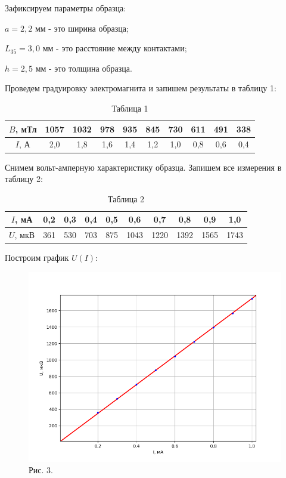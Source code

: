 \documentclass[a4paper,12pt]{article} %
\begin{document}
Зафиксируем параметры образца:

$a = 2,2$ мм - это ширина образца;

$L_{35} = 3,0$ мм - это расстояние между контактами;

$h = 2,5$ мм - это толщина образца.

\vspace{5mm}
Проведем градуировку электромагнита и запишем результаты в таблицу 1:

\begin{table}[h!]
	\centering
	\begin{tabular}{|c|c|c|c|c|c|c|c|c|c|}
		\hline
		$B$, мТл & 1057 & 1032 & 978 & 935 & 845 & 730 & 611 & 491 & 338 \\ \hline
		$I$, А   & 2,0  & 1,8  & 1,6 & 1,4 & 1,2 & 1,0 & 0,8 & 0,6 & 0,4 \\ \hline
	\end{tabular}
	\caption*{Таблица 1}
\end{table}

Снимем вольт-амперную характеристику образца. Запишем все измерения в таблицу 2:

\begin{table}[h!]
	\centering
	\begin{tabular}{|c|c|c|c|c|c|c|c|c|c|}
		\hline
		$I$, мА  & 0,2 & 0,3 & 0,4 & 0,5 & 0,6  & 0,7  & 0,8  & 0,9  & 1,0  \\ \hline
		$U$, мкВ & 361 & 530 & 703 & 875 & 1043 & 1220 & 1392 & 1565 & 1743 \\ \hline  
	\end{tabular}
	\caption*{Таблица 2}
\end{table}

Построим график $U(I)$:
\begin{figure}[h!]
	\centering
	\includegraphics[scale=0.73]{Pictures/U(I).png}
	\caption*{Рис. 3.}
\end{figure}
\end{document}
